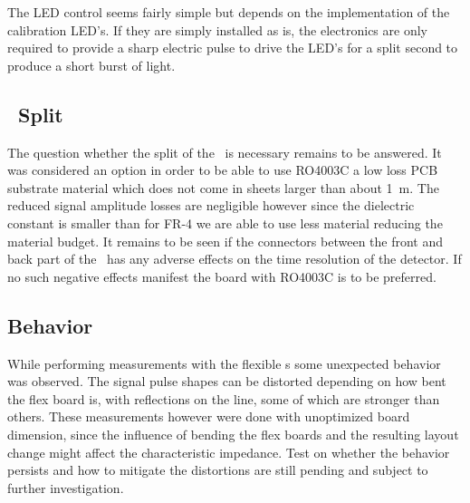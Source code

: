 \documentclass[../BTOF_summary.tex]{subfiles}
\begin{document}
The LED control seems fairly simple but depends on the implementation of the calibration LED's.
If they are simply installed as is, the electronics are only required to provide a sharp electric pulse to drive the LED's for a split second to produce a short burst of light.

\subsection[]{\railboard\ Split}

The question whether the split of the \railboard\ is necessary remains to be answered.
It was considered an option in order to be able to use RO4003C a low loss PCB substrate material which does not come in sheets larger than about \SI{1}{m}.
The reduced signal amplitude losses are negligible however since the dielectric constant is smaller than for FR-4 we are able to use less material reducing the material budget.
It remains to be seen if the connectors between the front and back part of the \railboard\ has any adverse effects on the time resolution of the detector.
If no such negative effects manifest the board with RO4003C is to be preferred.

\subsection{\sensorboard Behavior}

While performing measurements with the flexible \sensorboard s some unexpected behavior was observed.
The signal pulse shapes can be distorted depending on how bent the flex board is, with reflections on the line, some of which are stronger than others.
These measurements however were done with unoptimized board dimension, since the influence of bending the flex boards and the resulting layout change might affect the characteristic impedance.
Test on whether the behavior persists and how to mitigate the distortions are still pending and subject to further investigation.
\end{document}

